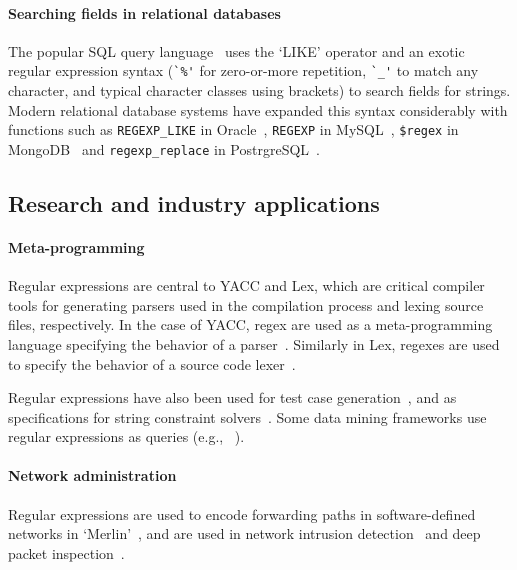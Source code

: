 \paragraph{Searching fields in relational databases}  The popular SQL query language~\cite{Chamberlin:1974:SSE:800296.811515} uses the `LIKE' operator and an exotic regular expression syntax (\verb!`%'! for zero-or-more repetition, \verb!`_'! to match any character, and typical character classes using brackets) to search fields for strings.  Modern relational database systems have expanded this syntax considerably with functions such as {\tt REGEXP\_LIKE} in Oracle~\citep{OracleRegexpLike}, {\tt REGEXP} in MySQL~\citep{MySQLRegexp}, {\tt\$regex} in MongoDB~\citep{MongoDBregex} and {\tt regexp\_replace} in PostrgreSQL~\citep{PostgreSQLregexreplace}.


\subsection{Research and industry applications}
\paragraph{Meta-programming}  Regular expressions are central to YACC and Lex, which are critical compiler tools for generating parsers used in the compilation process and lexing source files, respectively.  In the case of YACC, regex are used as a meta-programming language specifying the behavior of a parser~\citep{YACCManual}.  Similarly in Lex, regexes are used to specify the behavior of a source code lexer~\citep{LexManual}.

Regular expressions have also been used for test case generation~\cite{Ghosh:2013:JAT:2486788.2486925, Galler:2014:STD:2683035.2683100, Anand:2013:OSM:2503903.2503991, Tillmann:2014:TAT:2642937.2642941},  and as specifications for string constraint solvers~\cite{Trinh:2014:SSS:2660267.2660372, hampi}.  Some data mining frameworks use regular expressions as queries (e.g., ~\cite{Begel:2010:CDE:1806799.1806821}).

\paragraph{Network administration} Regular expressions are used to encode forwarding paths in software-defined networks in `Merlin'~\cite{Soule:2014:MLP:2674005.2674989}, and are used in network intrusion detection~\cite{network,Sommer:2003:EBN:948109.948145} and deep packet inspection~\cite{Kumar:2006:AAM:1151659.1159952,Yu:2006:FMR:1185347.1185360}.

